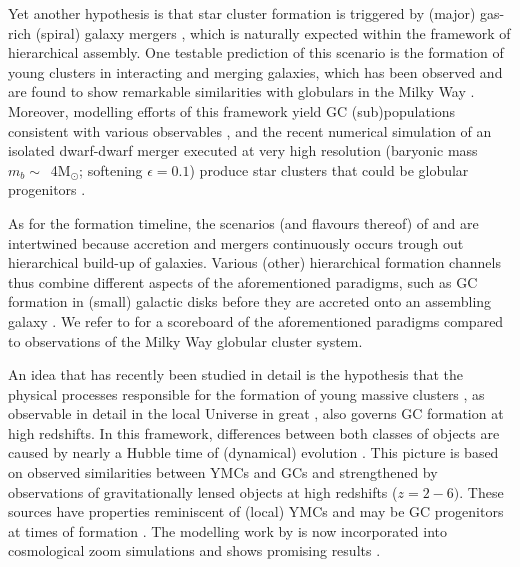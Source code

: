 \documentclass[a4paper,fleqn,usenatbib]{mnras}
\newcommand{\Sun}[0]{\ensuremath{_{\odot}}}
\begin{document}
Yet another hypothesis is that star cluster formation is triggered by (major) 
gas-rich (spiral) galaxy mergers \citep{1987nngp.proc...18S, 1992ApJ...384...50A},
which is naturally expected within the framework of hierarchical assembly. One
testable prediction of this scenario is the formation of young clusters in
interacting and merging galaxies, which has been observed and are found to show 
remarkable similarities with globulars in the Milky Way \citep[e.g.][]{
1995AJ....109..960W, 1996AJ....112..416H, 1999AJ....118..752Z, 1999AJ....118.1551W}.
Moreover, modelling efforts of this framework yield GC (sub)populations consistent 
with various observables \citep[e.g.][]{2010ApJ...718.1266M, 2018MNRAS.480.2343C}, 
and the recent numerical simulation of an isolated dwarf-dwarf merger executed at 
very high resolution (baryonic mass $m_b \sim$~4M\Sun; softening $\epsilon = 0.1$) 
produce star clusters that could be globular progenitors \citep{
2019arXiv190509840L}.

As for the formation timeline, the scenarios (and flavours thereof) of \citet{
1985ApJ...298...18F} and \citet{1992ApJ...384...50A} are intertwined because
accretion and mergers continuously occurs trough out hierarchical build-up of
galaxies. Various (other) hierarchical formation channels thus combine different
aspects of the aforementioned paradigms, such as GC formation in (small) galactic
disks before they are accreted onto an assembling galaxy \citep[e.g.][]{
2000ApJ...533..869C, 2002ApJ...567..853C, 2002MNRAS.333..383B, 2003egcs.conf..224G}. 
We refer to \citet{2001astro.ph..8034G} for a scoreboard of the aforementioned 
paradigms compared to observations of the Milky Way globular cluster system.

An idea that has recently been studied in detail is the hypothesis that the physical 
processes responsible for the formation of young massive clusters \citep[YMCs, 
see][for a review]{2010ARA&A..48..431P}, as observable in detail in the local 
Universe in great
, also governs GC formation at high redshifts. In this framework, differences
between both classes of objects are caused by nearly a Hubble time of (dynamical)
evolution \citep[e.g.][]{1987degc.book.....S}. This picture is based on observed 
similarities between YMCs and GCs \citep[e.g.][]{1992AJ....103..691H,1999AJ....118.1551W}
and strengthened by observations of gravitationally lensed objects at high redshifts
($z = 2-6)$. These sources have properties reminiscent of (local) YMCs and may be
GC progenitors at times of formation \citep{2017MNRAS.467.4304V,2017ApJ...843L..21J}.
The modelling work by \citet{2011MNRAS.414.1339K,2012MNRAS.421.1927K,2015MNRAS.454.1658K} 
is now incorporated into cosmological zoom simulations and shows promising results
\citep{2018MNRAS.475.4309P,2019MNRAS.486.3134K}.
\end{document}
